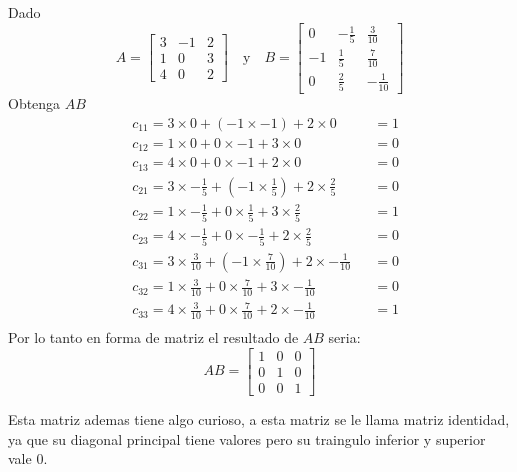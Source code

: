 \begin{ejemplo}
    \label{ejemplo_multipliación_matices_9}
    Dado 
    \[
    A = \begin{bmatrix}
        3 & -1 & 2 \\
        1 & 0 & 3 \\
        4 & 0 & 2 
    \end{bmatrix}
    \quad
    \text{y}
    \quad
    B = \begin{bmatrix}
        0 & -\frac{1}{5} & \frac{3}{10} \\
        -1 & \frac{1}{5} & \frac{7}{10} \\
        0 & \frac{2}{5} & -\frac{1}{10}
    \end{bmatrix}
    \]
    Obtenga \(AB\)
    $$
    \begin{aligned}
        & c_{11} = 3 \times 0 + (-1 \times -1) + 2 \times 0 &&= 1 \\
        & c_{12} = 1\times 0 + 0 \times -1 + 3 \times 0 &&= 0 \\
        & c_{13} = 4 \times 0 + 0 \times -1 + 2 \times 0 &&= 0 \\ 
        & c_{21} = 3 \times -\frac{1}{5} + (-1 \times \frac{1}{5}) + 2 \times \frac{2}{5} &&= 0 \\
        & c_{22} = 1\times -\frac{1}{5} + 0 \times \frac{1}{5} + 3 \times \frac{2}{5} && = 1 \\
        & c_{23} = 4 \times -\frac{1}{5} + 0 \times - \frac{1}{5} + 2 \times \frac{2}{5} && = 0 \\ 
        & c_{31} = 3 \times  \frac{3}{10} + (-1 \times \frac{7}{10}) + 2 \times -\frac{1}{10} && = 0 \\
        & c_{32} = 1\times \frac{3}{10} + 0 \times \frac{7}{10} + 3 \times -\frac{1}{10} && = 0 \\
        & c_{33} = 4 \times \frac{3}{10} + 0 \times \frac{7}{10} + 2 \times -\frac{1}{10} && = 1 \\
    \end{aligned}
    $$
    Por lo tanto en forma de matriz el resultado de \(AB\) seria: 
    \[
    AB = \begin{bmatrix}
        1 & 0 & 0 \\
        0 & 1 & 0 \\
        0 & 0 & 1
    \end{bmatrix}
    \]

    Esta matriz ademas tiene algo curioso, a esta matriz se le llama matriz identidad, ya que su diagonal principal tiene valores pero su traingulo inferior y superior vale \(0\).
\end{ejemplo}
